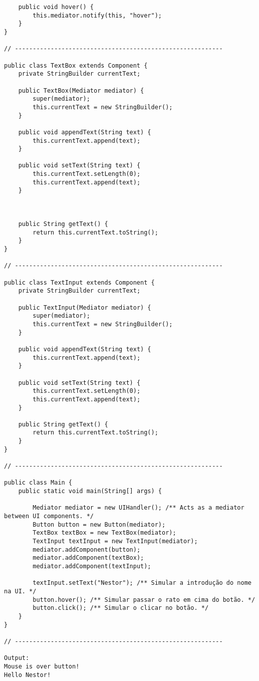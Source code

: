 \begin{verbatim}
    public void hover() {
        this.mediator.notify(this, "hover");
    }
}

// ----------------------------------------------------------

public class TextBox extends Component {
    private StringBuilder currentText;

    public TextBox(Mediator mediator) {
        super(mediator);
        this.currentText = new StringBuilder();
    }

    public void appendText(String text) {
        this.currentText.append(text);
    }

    public void setText(String text) {
        this.currentText.setLength(0);
        this.currentText.append(text);
    }



    public String getText() {
        return this.currentText.toString();
    }
}

// ----------------------------------------------------------

public class TextInput extends Component {
    private StringBuilder currentText;

    public TextInput(Mediator mediator) {
        super(mediator);
        this.currentText = new StringBuilder();
    }

    public void appendText(String text) {
        this.currentText.append(text);
    }

    public void setText(String text) {
        this.currentText.setLength(0);
        this.currentText.append(text);
    }

    public String getText() {
        return this.currentText.toString();
    }
}

// ----------------------------------------------------------

public class Main {
    public static void main(String[] args) {

        Mediator mediator = new UIHandler(); /** Acts as a mediator between UI components. */
        Button button = new Button(mediator);
        TextBox textBox = new TextBox(mediator);
        TextInput textInput = new TextInput(mediator);
        mediator.addComponent(button);
        mediator.addComponent(textBox);
        mediator.addComponent(textInput);

        textInput.setText("Nestor"); /** Simular a introdução do nome na UI. */
        button.hover(); /** Simular passar o rato em cima do botão. */
        button.click(); /** Simular o clicar no botão. */
    }
}

// ----------------------------------------------------------

Output:
Mouse is over button!
Hello Nestor!

\end{verbatim}

\appendix